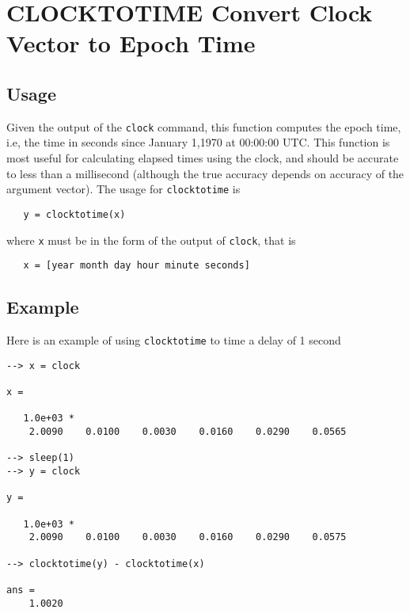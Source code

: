 \section{CLOCKTOTIME Convert Clock Vector to Epoch Time}

\subsection{Usage}

Given the output of the \verb|clock| command, this function computes
the epoch time, i.e, the time in seconds since January 1,1970 
at 00:00:00 UTC.  This function is most useful for calculating elapsed
times using the clock, and should be accurate to less than a millisecond
(although the true accuracy depends on accuracy of the argument vector). 
The usage for \verb|clocktotime| is
\begin{verbatim}
   y = clocktotime(x)
\end{verbatim}
where \verb|x| must be in the form of the output of \verb|clock|, that is
\begin{verbatim}
   x = [year month day hour minute seconds]
\end{verbatim}
\subsection{Example}

Here is an example of using \verb|clocktotime| to time a delay of 1 second
\begin{verbatim}
--> x = clock

x = 

   1.0e+03 * 
    2.0090    0.0100    0.0030    0.0160    0.0290    0.0565 

--> sleep(1)
--> y = clock

y = 

   1.0e+03 * 
    2.0090    0.0100    0.0030    0.0160    0.0290    0.0575 

--> clocktotime(y) - clocktotime(x)

ans = 
    1.0020 
\end{verbatim}
